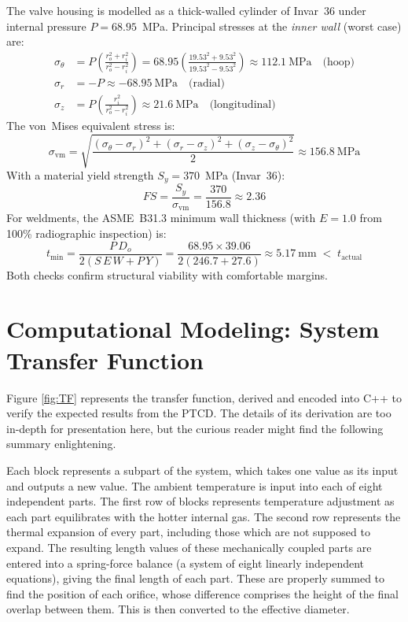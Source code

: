 \documentclass[12pt, letterpaper]{report}%
\newcounter{mycounter}           %
\newcounter{sub}[mycounter]      %
\newcommand{\device}{PTCD}
\begin{document}
\begin{appendices}
The valve housing is modelled as a thick-walled cylinder of Invar~36
under internal pressure $P = 68.95$~MPa. Principal stresses\cite[Sec.~3-14]{ref_shigley} at the
\emph{inner wall} (worst case) are:
\begin{align}
    \sigma_\theta
        &= P\left(\frac{r_o^2+r_i^2}{r_o^2-r_i^2}\right)
         = 68.95\left(\frac{19.53^2+9.53^2}{19.53^2-9.53^2}\right)
         \approx 112.1\ \text{MPa}
    \quad\text{(hoop)} \\
    \sigma_r   &= -P \approx -68.95\ \text{MPa}
    \quad\text{(radial)} \\
    \sigma_z
        &= P\left(\frac{r_i^2}{r_o^2-r_i^2}\right)
         \approx 21.6\ \text{MPa}
    \quad\text{(longitudinal)}
\end{align}
The von~Mises equivalent stress is:
\begin{equation}
    \sigma_\text{vm}
    = \sqrt{\frac{(\sigma_\theta-\sigma_r)^2
                 +(\sigma_r-\sigma_z)^2
                 +(\sigma_z-\sigma_\theta)^2}{2}}
    \approx 156.8\ \text{MPa}
\end{equation}
With a material yield strength $S_y = 370$~MPa (Invar~36):
\begin{equation}
    FS = \frac{S_y}{\sigma_\text{vm}}
               = \frac{370}{156.8}
               \approx 2.36
\end{equation}
For weldments, the ASME~B31.3 minimum wall thickness (with $E = 1.0$ from 100\%
radiographic inspection) is:
\begin{equation}
    t_\text{min}
    = \frac{P\,D_o}{2(S\,E\,W + P\,Y)}
    = \frac{68.95 \times 39.06}{2(246.7 + 27.6)}
    \approx 5.17\ \text{mm}
    \;<\;
    t_\text{actual}
\end{equation}
Both checks confirm structural viability with comfortable margins.

\chapter{Computational Modeling: System Transfer Function}
\label{app:modeling}

    Figure \ref{fig:TF} represents the transfer function, derived and encoded into C++ to verify the expected results from the \device.
    The details of its derivation are too in-depth for presentation here, but the curious reader might find the following summary enlightening.

    Each block represents a subpart of the system, which takes one value as its input and outputs a new value.
    The ambient temperature is input into each of eight independent parts. The first row of blocks represents temperature adjustment as each part equilibrates with the hotter internal gas.
    The second row represents the thermal expansion of every part, including those which are not supposed to expand.
    The resulting length values of these mechanically coupled parts are entered into a spring-force balance (a system of eight linearly independent equations), giving the final length of each part.
    These are properly summed to find the position of each orifice, whose difference comprises the height of the final overlap between them.
    This is then converted to the effective diameter.


\end{appendices}
\end{document}
